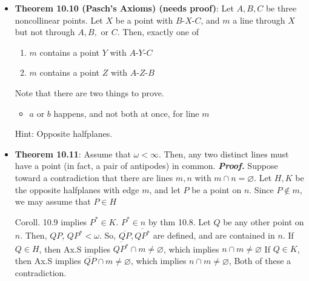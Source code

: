 \documentclass{report}
\begin{document}
\begin{itemize}
        \item \textbf{Theorem 10.10 (Pasch's Axioms) (needs proof)}: Let $A,B,C$ be three noncollinear points. Let $X$ be a point with $ B\text{-}X\text{-}C $, and $m$ a line through $X$ but not through $A,B,$ or $C$. Then, exactly one of
            \begin{enumerate}
                \item $m$ contains a point $Y$ with $ A\text{-}Y\text{-}C$
                \item $m$ contains a point $Z$ with $ A\text{-}Z\text{-}B $
            \end{enumerate}
            \bigbreak \noindent 
            \begin{figure}[ht]
                \centering
                \label{fig:pasch}
            \end{figure}
            \bigbreak \noindent 
            Note that there are two things to prove.
            \begin{itemize}
                \item $a$ or $b$ happens, and not both at once, for line $m$
            \end{itemize}
            Hint: Opposite halfplanes.
        \item \textbf{Theorem 10.11}: Assume that $\omega < \infty$. Then, any two distinct lines must have a point (in fact, a pair of antipodes) in common.
            \bigbreak \noindent 
            \textbf{\textit{Proof.}} Suppose toward a contradiction that there are lines $m,n$ with $m \cap n = \varnothing $. Let $H,K$ be the opposite halfplanes with edge $m$, and let $P$ be a point on $n$. Since $P \not\in m$, we may assume that $P \in H $
            \bigbreak \noindent 
            \begin{figure}[ht]
                \centering
                \label{fig:lines}
            \end{figure}
            \bigbreak \noindent 
            Coroll. 10.9 implies $P^{*} \in K$. $P^{*} \in n$ by thm 10.8. Let $Q$ be any other point on $n$. Then, $QP$, $QP^{*} < \omega$. So, $\overline{QP}, \overline{QP^{*}}$ are defined, and are contained in $n$. 
            \bigbreak \noindent 
            If $Q \in H$, then Ax.S implies $\overline{QP^{*}} \cap m \ne \varnothing$, which implies $n\cap m \ne \varnothing $
            \bigbreak \noindent 
            If $ Q\in K$, then Ax.S implies $\overline{QP} \cap m \ne \varnothing$, which implies $n \cap m \ne \varnothing $,
            \bigbreak \noindent 
            Both of these a contradiction.



    \end{itemize}
\end{document}
